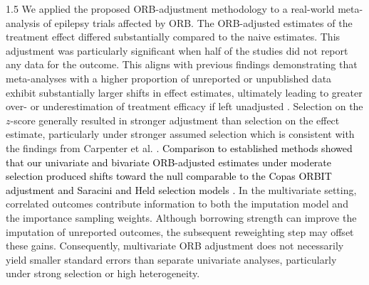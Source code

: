 \documentclass{article}
\newcommand{\mycolor}[1]{\textcolor{black}{#1}}
\begin{document}
\begin{spacing}{1.5}
We applied the proposed ORB-adjustment methodology to a real-world meta-analysis of epilepsy trials \cite{pulman2014topiramate, bresnahan2019topiramate} affected by ORB. The ORB-adjusted estimates of the treatment effect differed substantially compared to the naive estimates. This adjustment was particularly significant when half of the studies did not report any data for the outcome. This aligns with previous findings demonstrating that meta-analyses with a higher proportion of unreported or unpublished data exhibit substantially larger shifts in effect estimates, ultimately leading to greater over- or underestimation of treatment efficacy if left unadjusted \cite{saracini2025addressing, hart2012effect}. Selection on the $z$-score generally resulted in stronger adjustment than selection on the effect estimate, particularly under stronger assumed selection which is consistent with the findings from Carpenter et al. \cite{carpenter2007sensitivity}. \mycolor{Comparison to established methods showed that our univariate and bivariate ORB-adjusted estimates under moderate selection produced shifts toward the null comparable to the Copas ORBIT adjustment \cite{copas2019model} and Saracini and Held selection models \cite{saracini2025addressing}.} In the multivariate setting, correlated outcomes contribute information to both the imputation model and the importance sampling weights. Although borrowing strength can improve the imputation of unreported outcomes, the subsequent reweighting step may offset these gains. Consequently, multivariate ORB adjustment does not necessarily yield smaller standard errors than separate univariate analyses, particularly under strong selection or high heterogeneity.


\end{spacing}
\end{document}
